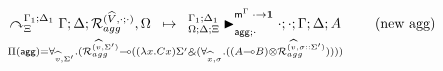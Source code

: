 \begin{align}
\underset{
   \Pi(\m{agg}) = \forall_{\widehat{v}, \Sigma'}.
   (\defstwo{agg}{\widehat{v}}{\Sigma'} \lolli ((\lambda x. C x)\Sigma' \with (\forall_{\widehat{x}, \sigma}.
                                                ((A \lolli B) \otimes
                                                 \defstwo{agg}{\widehat{v}}{\sigma
                                                 ::\Sigma'}))))
}
{
   \trans{
         \derstatex{\Gamma}{\Delta}{\Xi}{\Gamma_1}{\Delta_1}{\defstwo{agg}{\widehat{V}}{\cdot
         ; \cdot}, \Omega}
   }
   {\matstateal{\Delta}{\cdot ; \cdot}{\Gamma}{\Delta}{A}{\cdot \rightarrow
   \one}{\cdot}{\Gamma_1 ; \Delta_1}{\Omega}
   }
} \tag{new agg}
\end{align}
